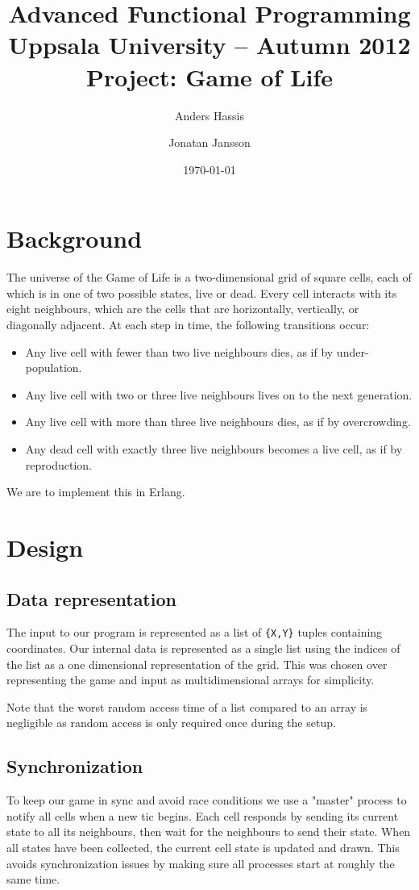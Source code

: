 \documentclass[a4paper,11pt]{article}
\title{\textbf{Advanced Functional Programming \\
    Uppsala University -- Autumn 2012 \\
    Project: Game of Life
  }
}
\author{Anders Hassis \and Jonatan Jansson}
\date{\today}
\begin{document}
\maketitle

\section{Background}

The universe of the Game of Life is a two-dimensional grid of square cells, each of which is in one of two possible states, live or dead. Every cell interacts with its eight neighbours, which are the cells that are horizontally, vertically, or diagonally adjacent. At each step in time, the following transitions occur:

\begin{itemize}
\item Any live cell with fewer than two live neighbours dies, as if by under-population.
\item Any live cell with two or three live neighbours lives on to the next generation.
\item Any live cell with more than three live neighbours dies, as if by overcrowding.
\item Any dead cell with exactly three live neighbours becomes a live cell, as if by reproduction.
\end{itemize}

\noindent We are to implement this in Erlang.

\section{Design}

\subsection{Data representation}
The input to our program is represented as a list of \texttt{\{X,Y\}} tuples containing coordinates. Our internal data is represented as a single list using the indices of the list as a one dimensional representation of the grid. This was chosen over representing the game and input as multidimensional arrays for simplicity.

Note that the worst random access time of a list compared to an array is negligible as random access is only required once during the setup.

\subsection{Synchronization}
To keep our game in sync and avoid race conditions we use a "master" process to notify all cells when a new tic begins. Each cell responds by sending its current state to all its neighbours, then wait for the neighbours to send their state. When all states have been collected, the current cell state is updated and drawn. This avoids synchronization issues by making sure all processes start at roughly the same time. 
\end{document}
